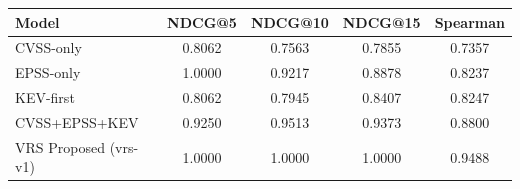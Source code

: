 \begin{table}[h]
\centering
\begin{tabular}{lcccc}
\hline
Model & NDCG@5 & NDCG@10 & NDCG@15 & Spearman \\
\hline
CVSS-only & 0.8062 & 0.7563 & 0.7855 & 0.7357 \\
EPSS-only & 1.0000 & 0.9217 & 0.8878 & 0.8237 \\
KEV-first & 0.8062 & 0.7945 & 0.8407 & 0.8247 \\
CVSS+EPSS+KEV & 0.9250 & 0.9513 & 0.9373 & 0.8800 \\
VRS Proposed (vrs-v1) & 1.0000 & 1.0000 & 1.0000 & 0.9488 \\
\hline
\end{tabular}
\end{table}